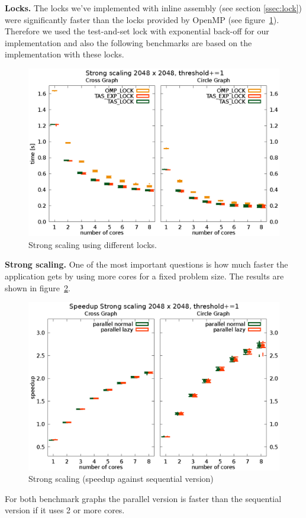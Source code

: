 \documentclass[letterpaper]{article}
\newcommand{\mypar}[1]{{\bf #1.}}
\begin{document}
\mypar{Locks}
The locks we've implemented with inline assembly (see section \ref{ssec:lock}) were significantly faster than the locks provided by OpenMP (see figure~\ref{fig:lock_bench}). Therefore we used the test-and-set lock with exponential back-off for our implementation and also the following benchmarks are based on the implementation with these locks.

\begin{figure}[h]\centering
  \includegraphics[scale=0.558]{lock_benchmark.eps}
  \caption{Strong scaling using different locks.\label{fig:lock_bench}}
\end{figure}


\mypar{Strong scaling}
One of the most important questions is how much faster the application gets by using more cores for a fixed problem size. The results are shown in figure~\ref{fig:strong_scaling}.
\begin{figure}[h]\centering
  \includegraphics[scale=0.558]{strong_scaling_speedup.eps}
  \caption{Strong scaling (speedup against sequential version) \label{fig:strong_scaling}}
\end{figure}
For both benchmark graphs the parallel version is faster than the sequential version if it uses 2 or more cores.
\end{document}
